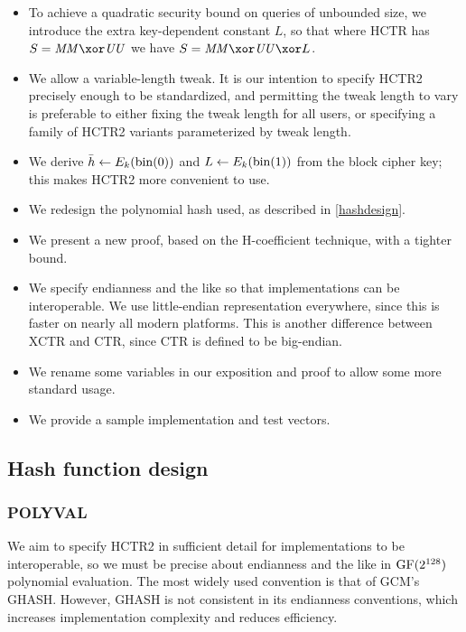 \documentclass[hctr2.tex]{subfiles}
\begin{document}
\begin{itemize}
    \item To achieve a quadratic security bound
    on queries of unbounded size,
    we introduce the extra
    key-dependent constant \(L\),
    so that where HCTR has \(S = \MM \xor \UU\)
    we have \(S = \MM \xor \UU \xor L\).
    \item We allow a variable-length tweak. It is our intention to specify
    HCTR2 precisely enough to be standardized, and permitting the tweak length
    to vary is preferable to either fixing the tweak length for all users,
    or specifying a family of HCTR2 variants parameterized by tweak length.
    \item We derive \(\bar{h} \gets E_k(\operatorname{bin}(0))\)
    and \(L \gets E_k(\operatorname{bin}(1))\) from the block cipher key;
    this makes HCTR2 more convenient to use.
    \item We redesign the polynomial hash used, as described in
    \autoref{hashdesign}.
    \item We present a new proof, based on the H-coefficient technique,
    with a tighter bound.
    \item We specify endianness and the like so that implementations can be interoperable. We use little-endian representation everywhere,
    since this is faster on nearly all modern platforms.
    This is another difference between XCTR and CTR, since
    CTR is defined to be big-endian.
    \item We rename some variables in our exposition and proof to allow some more standard usage.
    \item We provide a sample implementation and test vectors.
\end{itemize}

\subsection{Hash function design}\label{hashdesign}

\subsubsection{POLYVAL}

We aim to specify HCTR2 in sufficient detail
for implementations to be interoperable,
so we must be precise about endianness and the like
in \(\operatorname{GF}(2^{128})\) polynomial evaluation.
The most widely used  convention is that of GCM's GHASH\cite{gcm}.
However, GHASH is not consistent in its endianness conventions,
which increases implementation complexity and reduces efficiency.
\end{document}
